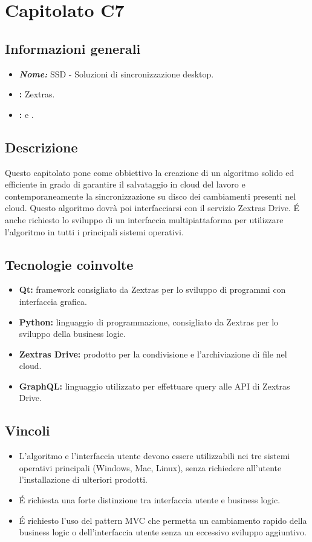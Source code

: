 \section{Capitolato C7}

\subsection{Informazioni generali}
\begin{itemize}
\item \textbf{\emph{Nome:}} SSD - Soluzioni di sincronizzazione desktop.
\item \textbf{\commitProg:} Zextras.
\item \textbf{\proponProg:} \VT{} e \CR.
\end{itemize}

\subsection{Descrizione}
Questo capitolato pone come obbiettivo la creazione di un algoritmo solido ed efficiente in grado di garantire il salvataggio in cloud del lavoro e contemporaneamente la sincronizzazione su disco dei cambiamenti presenti nel cloud. Questo algoritmo dovrà poi interfacciarsi con il servizio Zextras Drive. É anche richiesto lo sviluppo di un interfaccia multipiattaforma per utilizzare l'algoritmo in tutti i principali sistemi operativi.

\subsection{Tecnologie coinvolte}
\begin{itemize}
\item \textbf{Qt:} framework consigliato da Zextras per lo sviluppo di programmi con interfaccia grafica.
\item \textbf{Python:} linguaggio di programmazione, consigliato da Zextras per lo sviluppo della business logic.
\item \textbf{Zextras Drive:} prodotto per la condivisione e l'archiviazione di file nel cloud.
\item \textbf{GraphQL:} linguaggio utilizzato per effettuare query alle API di Zextras Drive.
\end{itemize}

\subsection{Vincoli}
\begin{itemize}
\item L'algoritmo e l'interfaccia utente devono essere utilizzabili nei tre sistemi operativi principali (Windows, Mac, Linux), senza richiedere all'utente l'installazione di ulteriori prodotti.
\item É richiesta una forte distinzione tra interfaccia utente e business logic.
\item É richiesto l'uso del pattern MVC che permetta un cambiamento rapido della business logic o dell'interfaccia utente senza un eccessivo sviluppo aggiuntivo.
\end{itemize}


